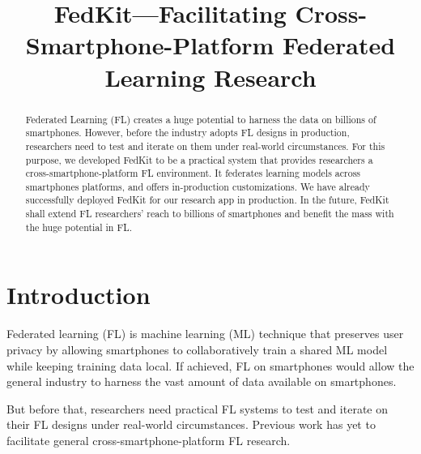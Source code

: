 \documentclass[letterpaper]{article} %
\title{FedKit---Facilitating Cross-Smartphone-Platform Federated Learning Research}
\author{}
\begin{document}
\maketitle

\begin{abstract}
    Federated Learning (FL) creates a huge potential to
    harness the data on billions of smartphones.
    However, before the industry adopts FL designs in production,
    researchers need to test and iterate on them under real-world circumstances.
    For this purpose,
    we developed FedKit to be a practical system that provides researchers
    a cross-smartphone-platform FL environment.
    It federates learning models across smartphones platforms,
    and offers in-production customizations.
    We have already successfully deployed FedKit for our research app
    in production.
    In the future,
    FedKit shall extend FL researchers' reach to billions of smartphones and
    benefit the mass with the huge potential in FL.
\end{abstract}

\section{Introduction}

Federated learning (FL)
is machine learning (ML) technique that preserves user privacy by
allowing smartphones to collaboratively train a shared ML model while
keeping training data local.
If achieved, FL on smartphones would allow the general industry to
harness the vast amount of data available on smartphones.

But before that, researchers need practical FL systems to test and
iterate on their FL designs under real-world circumstances.
Previous work has yet to facilitate general cross-smartphone-platform
FL research.
\end{document}
